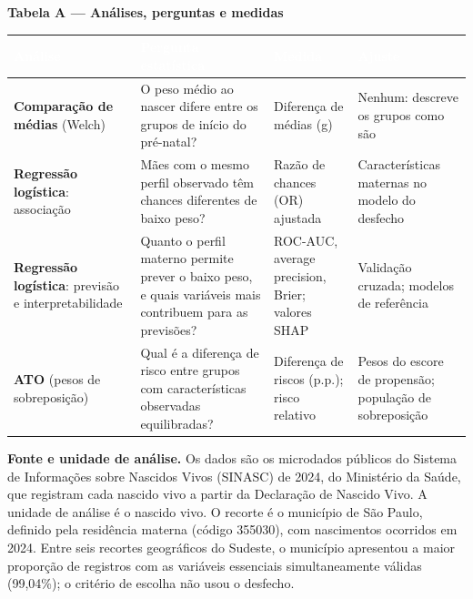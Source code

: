 \documentclass[10pt,a4paper]{article}
\begin{document}
\par\vspace{4pt}
{\footnotesize\bfseries\color{iptescuro} Tabela A --- Análises, perguntas e medidas\par}\vspace{2pt}
{\footnotesize\renewcommand{\arraystretch}{1.2}\setlength{\tabcolsep}{4pt}
\begin{tabular}{>{\raggedright\arraybackslash}p{} >{\raggedright\arraybackslash}p{} >{\raggedright\arraybackslash}p{} >{\raggedright\arraybackslash}p{}}
\rowcolor{iptazul}\textcolor{white}{\bfseries Análise} & \textcolor{white}{\bfseries Pergunta estatística} & \textcolor{white}{\bfseries Medida} & \textcolor{white}{\bfseries Ajuste} \\ \hline
\textbf{Comparação de médias} (Welch) & O peso médio ao nascer difere entre os grupos de início do pré-natal? & Diferença de médias (g) & Nenhum: descreve os grupos como são \\ \hline
\textbf{Regressão logística}: associação & Mães com o mesmo perfil observado têm chances diferentes de baixo peso? & Razão de chances (OR) ajustada & Características maternas no modelo do desfecho \\ \hline
\textbf{Regressão logística}: previsão e interpretabilidade & Quanto o perfil materno permite prever o baixo peso, e quais variáveis mais contribuem para as previsões? & ROC-AUC, average precision, Brier; valores SHAP & Validação cruzada; modelos de referência \\ \hline
\textbf{ATO} (pesos de sobreposição) & Qual é a diferença de risco entre grupos com características observadas equilibradas? & Diferença de riscos (p.p.); risco relativo & Pesos do escore de propensão; população de sobreposição \\ \hline
\end{tabular}\par}\par\vspace{6pt}


{\color{iptescuro}\bfseries Fonte e unidade de análise.} Os dados são os microdados públicos do Sistema de Informações sobre Nascidos Vivos (SINASC) de 2024, do Ministério da Saúde, que registram cada nascido vivo a partir da Declaração de Nascido Vivo. A unidade de análise é o nascido vivo. O recorte é o município de São Paulo, definido pela residência materna (código 355030), com nascimentos ocorridos em 2024. Entre seis recortes geográficos do Sudeste, o município apresentou a maior proporção de registros com as variáveis essenciais simultaneamente válidas (99,04\%); o critério de escolha não usou o desfecho.\par
\end{document}
